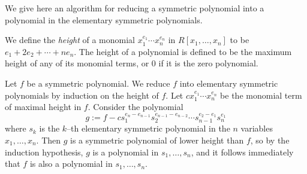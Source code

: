 \documentclass[12pt]{article}
\begin{document}
We give here an algorithm for reducing a symmetric polynomial into a polynomial in the elementary symmetric polynomials.

We define the {\em height} of a monomial $x_1^{e_1} \cdots x_n^{e_n}$ in $R[x_1,\dots,x_n]$ to be $e_1 + 2 e_2 + \cdots + n e_n$. The height of a polynomial is defined to be the maximum height of any of its monomial terms, or 0 if it is the zero polynomial.

Let $f$ be a symmetric polynomial. We reduce $f$ into elementary symmetric polynomials by induction on the height of $f$. Let $c x_1^{e_1} \cdots x_n^{e_n}$ be the monomial term of maximal height in $f$. Consider the polynomial
$$
g := f - c s_1^{e_n - e_{n-1}} s_2^{e_{n-1} - e_{n-2}} \cdots s_{n-1}^{e_2 - e_1} s_n^{e_1}
$$
where $s_k$ is the $k$--th elementary symmetric polynomial in the $n$ variables $x_1, \dots, x_n$. Then $g$ is a symmetric polynomial of lower height than $f$, so by the induction hypothesis, $g$ is a polynomial in $s_1, \dots, s_n$, and it follows immediately that $f$ is also a polynomial in $s_1, \dots, s_n$.
\end{document}
